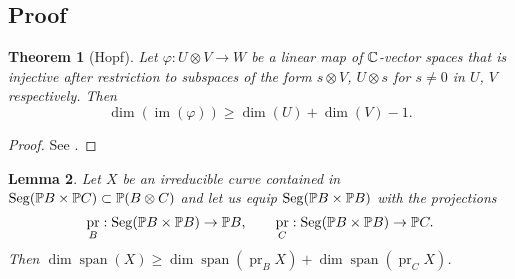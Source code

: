 \documentclass[a4paper,10pt]{article}
\let\phi\varphi
\DeclareMathOperator{\im}{im}
\DeclareMathOperator{\Seg}{Seg}
\DeclareMathOperator{\pr}{pr}
\DeclareMathOperator{\spn}{span}
\newtheorem{theorem}{Theorem}
\newtheorem{lemma}[theorem]{Lemma}
\theoremstyle{definition}
\theoremstyle{remark}
\begin{document}
\subsection{Proof}


\begin{theorem}[Hopf]
    \label{thrm:hopf}
    Let $\phi: U \otimes V \to W$ be a linear map of $\ce$-vector spaces that is injective after restriction to subspaces of the form $s \otimes V$, $U \otimes s$ for $s\neq0$ in $U$, $V$ respectively. Then
    \[ \dim(\im(\phi)) \geq \dim(U) + \dim(V) -1. \]
\end{theorem}
\begin{proof}
    See \cite[Proposition 1.3]{smith}.
\end{proof}

\begin{lemma}
    \label{lem:curve}
    Let $X$ be an irreducible curve contained in $\Seg(\pe B\times\pe C)\subset \pe(B\otimes C)$ and let us equip $\Seg(\pe B\times \pe B)$ with the projections
    \[
        \pr_B: \Seg(\pe B\times \pe B)\to \pe B,\qquad \pr_C: \Seg(\pe B\times \pe B)\to \pe C.
    \]
    Then $\dim\spn(X)\geq \dim\spn(\pr_B X)+\dim\spn(\pr_C X)$.
\end{lemma}
\end{document}

